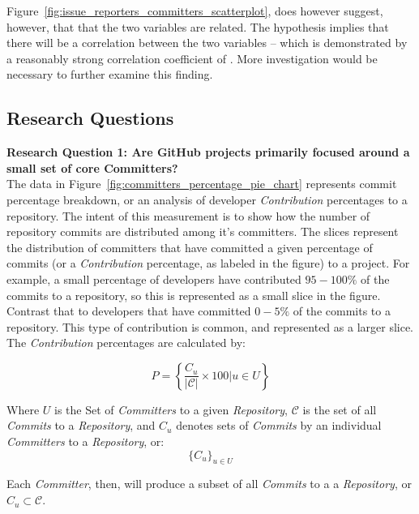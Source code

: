 \documentclass{proc}
\begin{document}
{{{{{{Figure~\ref{fig:issue_reporters_committers_scatterplot}, does however suggest, however, that that the two variables are related. The hypothesis implies that there will be a correlation between the two variables -- which is demonstrated by a reasonably strong correlation coefficient of }\unskip. More investigation would be necessary to further examine this finding.\\

\subsection{Research Questions}
\noindent \textbf{Research Question 1: Are GitHub projects primarily focused around a small set of core Committers?}\\
The data in Figure~\ref{fig:committers_percentage_pie_chart} represents commit percentage breakdown, or an analysis of developer \textit{Contribution} percentages to a repository. The intent of this measurement is to show how the number of repository commits are distributed among it's committers. The slices represent the distribution of committers that have committed a given percentage of commits (or a \textit{Contribution} percentage, as labeled in the figure) to a project. For example, a small percentage of developers have contributed $95-100\%$ of the commits to a repository, so this is represented as a small slice in the figure. Contrast that to developers that have committed $0-5\%$ of the commits to a repository. This type of contribution is common, and represented as a larger slice. The \textit{Contribution} percentages are calculated by:

\begin{equation}
P = \left\{ \frac{ C_u } { |\mathscr{C}| } \times 100 \Big| u \in U \right\}
\label{eq:commit_percentage}
\end{equation}

Where $U$ is the Set of \textit{Committers} to a given \textit{Repository}, $\mathscr{C}$ is the set of all \textit{Commits} to a \textit{Repository}, and $C_u$ denotes sets of \textit{Commits} by an individual \textit{Committers} to a \textit{Repository}, or:
 \[ \{ C_u \}_{u \in U} \]

Each \textit{Committer}, then, will produce a subset of all \textit{Commits} to a a \textit{Repository}, or $C_u \subset \mathscr{C}$. 

}}}}}
\end{document}
